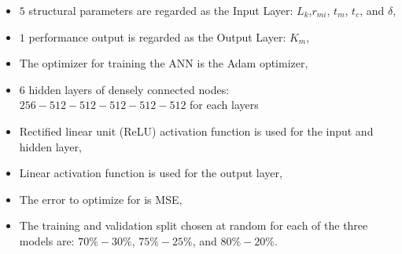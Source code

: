             
            \begin{itemize}
                \item $5$ structural parameters are regarded as the Input Layer: $L_k$,$r_{mi}$, $t_m$, $t_c$, and $\delta$,
                \item $1$ performance output is regarded as the Output Layer: $K_m$,
                \item The optimizer for training the \acs{ANN} is the Adam optimizer,
                \item $6$ hidden layers of densely connected nodes: $256-512-512-512-512-512$ for each layers
                \item Rectified linear unit (ReLU) activation function is used
for the input and hidden layer,
                \item Linear activation function is used for the output layer,
                \item The error to optimize for is \acs{MSE},
                \item The training and validation split chosen at random for each of the three models are: $70\%-30\%$, $75\%-25\%$, and $80\%-20\%$.
            \end{itemize}
            
